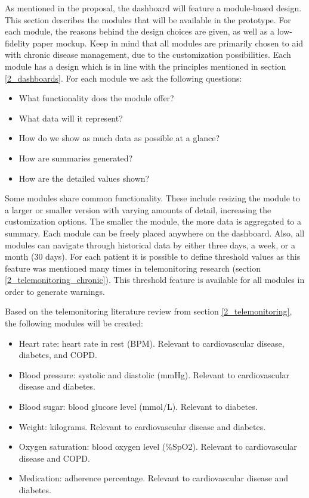     As mentioned in the proposal, the dashboard will feature a module-based design. This section describes the modules that will be available in the prototype. For each module, the reasons behind the design choices are given, as well as a low-fidelity paper mockup. Keep in mind that all modules are primarily chosen to aid with chronic disease management, due to the customization possibilities. Each module has a design which is in line with the principles mentioned in section \ref{2_dashboards}. For each module we ask the following questions:
    \begin{itemize}
        \item What functionality does the module offer?
        \item What data will it represent?
        \item How do we show as much data as possible at a glance?
        \item How are summaries generated?
        \item How are the detailed values shown?
    \end{itemize}

    Some modules share common functionality. These include resizing the module to a larger or smaller version with varying amounts of detail, increasing the customization options. The smaller the module, the more data is aggregated to a summary. Each module can be freely placed anywhere on the dashboard. Also, all modules can navigate through historical data by either three days, a week, or a month (30 days). For each patient it is possible to define threshold values as this feature was mentioned many times in telemonitoring research (section \ref{2_telemonitoring_chronic}). This threshold feature is available for all modules in order to generate warnings.

    Based on the telemonitoring literature review from section \ref{2_telemonitoring}, the following modules will be created:
    \begin{itemize}
        \item Heart rate: heart rate in rest (BPM). Relevant to cardiovascular disease, diabetes, and COPD.
        \item Blood pressure: systolic and diastolic (mmHg). Relevant to cardiovascular disease and diabetes.
        \item Blood sugar: blood glucose level (mmol/L). Relevant to diabetes.
        \item Weight: kilograms. Relevant to cardiovascular disease and diabetes.
        \item Oxygen saturation: blood oxygen level (\%SpO2). Relevant to cardiovascular disease and COPD.
        \item Medication: adherence percentage. Relevant to cardiovascular disease and diabetes.
    \end{itemize}

